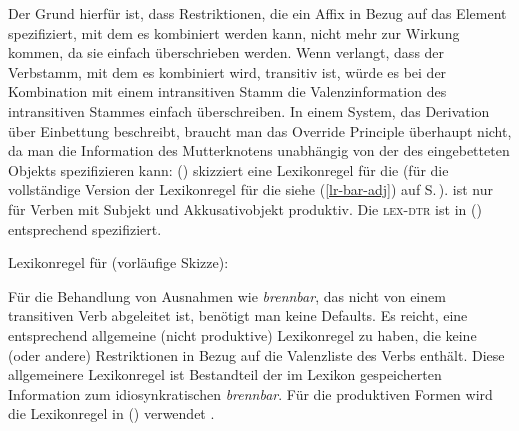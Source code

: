 Der Grund hierfür ist, dass Restriktionen, die ein Affix in Bezug auf das Element spezifiziert, mit dem es
kombiniert werden kann, nicht mehr zur Wirkung kommen, da sie einfach überschrieben werden.
Wenn \zb \bars verlangt, dass der Verbstamm, mit dem es kombiniert wird, transitiv ist, würde es bei
der Kombination mit einem intransitiven Stamm die Valenzinformation des intransitiven Stammes
einfach überschreiben.
In einem System, das Derivation über Einbettung beschreibt, braucht man das Override Principle
überhaupt nicht, da man die Information des Mutterknotens unabhängig von der des eingebetteten
Objekts spezifizieren kann: () skizziert eine Lexikonregel für die \bard (für die
vollständige Version der Lexikonregel für die \bard siehe (\ref{lr-bar-adj}) auf S.\,\pageref{lr-bar-adj}).
\bard ist nur für Verben mit Subjekt und Akkusativobjekt produktiv. Die \textsc{lex-dtr} ist in
() entsprechend spezifiziert. 

\eas
\label{lr-bard-skizze}%
Lexikonregel für \bard (vorläufige Skizze):\\
\zs
\largerpage

\noindent
Für die Behandlung von Ausnahmen wie \zb \emph{brennbar}, das nicht von einem transitiven Verb
abgeleitet ist, benötigt man keine Defaults. Es reicht, eine entsprechend allgemeine (nicht
produktive) Lexikonregel zu haben, die keine (oder andere) Restriktionen in Bezug auf die Valenzliste des Verbs enthält. 
Diese allgemeinere Lexikonregel ist Bestandteil der im Lexikon gespeicherten Information
zum idiosynkratischen \emph{brennbar}. Für die produktiven Formen wird die Lexikonregel in ()
verwendet \citep[, 68]{Riehemann98a}.



